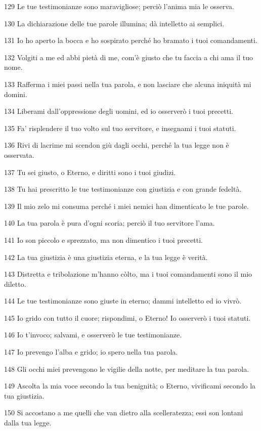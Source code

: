 \par 129 Le tue testimonianze sono maravigliose; perciò l'anima mia le osserva.
\par 130 La dichiarazione delle tue parole illumina; dà intelletto ai semplici.
\par 131 Io ho aperto la bocca e ho sospirato perché ho bramato i tuoi comandamenti.
\par 132 Volgiti a me ed abbi pietà di me, com'è giusto che tu faccia a chi ama il tuo nome.
\par 133 Rafferma i miei passi nella tua parola, e non lasciare che alcuna iniquità mi domini.
\par 134 Liberami dall'oppressione degli uomini, ed io osserverò i tuoi precetti.
\par 135 Fa' risplendere il tuo volto sul tuo servitore, e insegnami i tuoi statuti.
\par 136 Rivi di lacrime mi scendon giù dagli occhi, perché la tua legge non è osservata.
\par 137 Tu sei giusto, o Eterno, e diritti sono i tuoi giudizi.
\par 138 Tu hai prescritto le tue testimonianze con giustizia e con grande fedeltà.
\par 139 Il mio zelo mi consuma perché i miei nemici han dimenticato le tue parole.
\par 140 La tua parola è pura d'ogni scoria; perciò il tuo servitore l'ama.
\par 141 Io son piccolo e sprezzato, ma non dimentico i tuoi precetti.
\par 142 La tua giustizia è una giustizia eterna, e la tua legge è verità.
\par 143 Distretta e tribolazione m'hanno còlto, ma i tuoi comandamenti sono il mio diletto.
\par 144 Le tue testimonianze sono giuste in eterno; dammi intelletto ed io vivrò.
\par 145 Io grido con tutto il cuore; rispondimi, o Eterno! Io osserverò i tuoi statuti.
\par 146 Io t'invoco; salvami, e osserverò le tue testimonianze.
\par 147 Io prevengo l'alba e grido; io spero nella tua parola.
\par 148 Gli occhi miei prevengono le vigilie della notte, per meditare la tua parola.
\par 149 Ascolta la mia voce secondo la tua benignità; o Eterno, vivificami secondo la tua giustizia.
\par 150 Si accostano a me quelli che van dietro alla scelleratezza; essi son lontani dalla tua legge.
